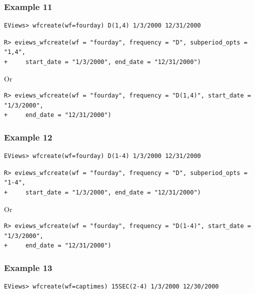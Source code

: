 \hypertarget{example-11-1}{%
\subsubsection{Example 11}\label{example-11-1}}

\begin{verbatim}
EViews> wfcreate(wf=fourday) D(1,4) 1/3/2000 12/31/2000
\end{verbatim}

\begin{verbatim}
R> eviews_wfcreate(wf = "fourday", frequency = "D", subperiod_opts = "1,4",
+     start_date = "1/3/2000", end_date = "12/31/2000")
\end{verbatim}

Or

\begin{verbatim}
R> eviews_wfcreate(wf = "fourday", frequency = "D(1,4)", start_date = "1/3/2000",
+     end_date = "12/31/2000")
\end{verbatim}

\hypertarget{example-12-1}{%
\subsubsection{Example 12}\label{example-12-1}}

\begin{verbatim}
EViews> wfcreate(wf=fourday) D(1-4) 1/3/2000 12/31/2000
\end{verbatim}

\begin{verbatim}
R> eviews_wfcreate(wf = "fourday", frequency = "D", subperiod_opts = "1-4",
+     start_date = "1/3/2000", end_date = "12/31/2000")
\end{verbatim}

Or

\begin{verbatim}
R> eviews_wfcreate(wf = "fourday", frequency = "D(1-4)", start_date = "1/3/2000",
+     end_date = "12/31/2000")
\end{verbatim}

\hypertarget{example-13-1}{%
\subsubsection{Example 13}\label{example-13-1}}

\begin{verbatim}
EViews> wfcreate(wf=captimes) 15SEC(2-4) 1/3/2000 12/30/2000
\end{verbatim}

